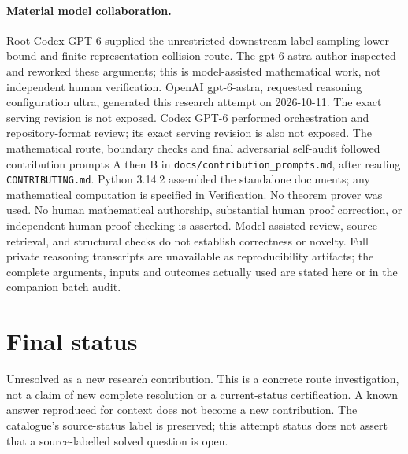 \documentclass[11pt]{article}
\begin{document}
\paragraph{Material model collaboration.} Root Codex GPT-6 supplied the unrestricted downstream-label sampling lower bound and finite representation-collision route. The gpt-6-astra author inspected and reworked these arguments; this is model-assisted mathematical work, not independent human verification.
OpenAI gpt-6-astra, requested reasoning configuration ultra, generated this research
attempt on 2026-10-11. The exact serving revision is not exposed. Codex GPT-6
performed orchestration and repository-format review; its exact serving revision
is also not exposed. The mathematical route, boundary checks and final adversarial
self-audit followed contribution prompts A then B in
\texttt{docs/contribution\_prompts.md}, after reading \texttt{CONTRIBUTING.md}.
Python 3.14.2 assembled the standalone documents; any mathematical computation is
specified in Verification. No theorem prover was used. No human mathematical
authorship, substantial human proof correction, or independent human proof checking
is asserted. Model-assisted review, source retrieval, and structural checks do not
establish correctness or novelty. Full private reasoning transcripts are unavailable
as reproducibility artifacts; the complete arguments, inputs and outcomes actually
used are stated here or in the companion batch audit.
\section{Final status}
Unresolved as a new research contribution. This is a concrete route investigation,
not a claim of new complete resolution or a current-status certification. A known
answer reproduced for context does not become a new contribution. The catalogue's
source-status label is preserved; this attempt status does not assert that a
source-labelled solved question is open.
\end{document}
